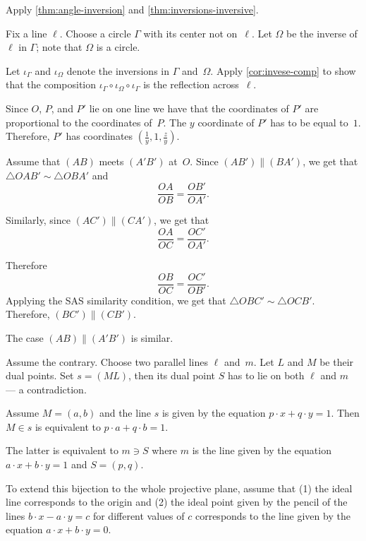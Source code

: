  Apply \ref{thm:angle-inversion} and \ref{thm:inversions-inversive}.
 
Fix a line $\ell$.
Choose a circle $\Gamma$ with its center not on~$\ell$.
Let $\Omega$ be the inverse of $\ell$ in $\Gamma$;
note that $\Omega$ is a circle.

Let $\iota_\Gamma$ and $\iota_\Omega$ denote the inversions in $\Gamma$ and~$\Omega$.
Apply \ref{cor:invese-comp} to show that the composition 
$\iota_\Gamma\circ\iota_\Omega\circ\iota_\Gamma$
is the reflection across~$\ell$.

\setcounter{eqtn}{0}

Since $O$, $P$, and $P'$ lie on one line we have that the coordinates of $P'$ are proportional to the coordinates of~$P$.
The $y$ coordinate of $P'$ has to be equal to~$1$.
Therefore, $P'$ has coordinates 
$(\tfrac1y,1,\tfrac zy)$.

Assume that $(AB)$ meets $(A'B')$ at~$O$.
Since $(AB')\parallel (BA')$, we get that $\triangle OAB'\sim\triangle OBA'$
and
\[\frac{OA}{OB}=\frac{OB'}{OA'}.\]

Similarly, since $(AC')\parallel (CA')$, we get that
\[\frac{OA}{OC}=\frac{OC'}{OA'}.\]

Therefore
\[\frac{OB}{OC}=\frac{OC'}{OB'}.\]
Applying the SAS similarity condition, we get that
$\triangle OBC'\sim\triangle OCB'$.
Therefore, $(BC')\parallel (CB')$.

The case $(AB)\parallel(A'B')$ is similar.

Assume the contrary.
Choose two parallel lines $\ell$ and~$m$.
Let $L$ and $M$ be their dual points.
Set $s=(ML)$, then its dual point $S$ has to lie on both $\ell$ and $m$ --- a contradiction.

Assume $M=(a,b)$ 
and the line $s$ is given by the equation $p\cdot x+q\cdot y=1$.
Then $M\in s$ is equivalent to $p\cdot a+q\cdot b=1$.

The latter is equivalent to $m\ni S$
where $m$ is the line given by the equation 
$a\cdot x+b\cdot y=1$ and $S=(p,q)$.

To extend this bijection to the whole projective plane, assume that 
(1) the ideal line corresponds to the origin 
and (2) the ideal point given by the pencil of the lines $b\cdot x-a\cdot y=c$ for different values of $c$ corresponds to the line given by the equation $a\cdot x+b\cdot y=0$.

